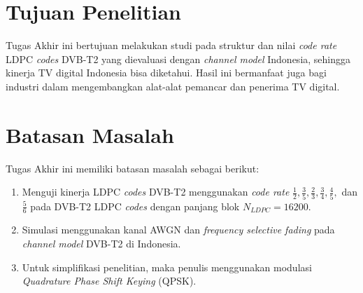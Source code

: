 \section{Tujuan Penelitian}

Tugas Akhir ini bertujuan melakukan studi pada struktur dan nilai \textit{code rate} LDPC \textit{codes} DVB-T2 yang dievaluasi dengan \textit{channel model} Indonesia, sehingga kinerja TV digital Indonesia bisa diketahui. Hasil ini bermanfaat juga bagi industri dalam mengembangkan alat-alat pemancar dan penerima TV digital.


\section{Batasan Masalah}
Tugas Akhir ini memiliki batasan masalah sebagai berikut:
\begin{enumerate}
	\item Menguji kinerja LDPC \textit{codes} DVB-T2 menggunakan \textit{code rate} $\frac{1}{2}, \frac{3}{5}, \frac{2}{3}, \frac{3}{4}, \frac{4}{5},$ dan $\frac{5}{6}$ pada DVB-T2 LDPC \textit{codes} dengan panjang blok $N_{LDPC}=16200$.
	\item Simulasi menggunakan kanal AWGN dan \textit{frequency selective fading} pada \textit{channel model} DVB-T2 di Indonesia.
	\item Untuk simplifikasi penelitian, maka penulis menggunakan modulasi \textit{Quadrature Phase Shift Keying} (QPSK).     	 
\end{enumerate}
%
%

